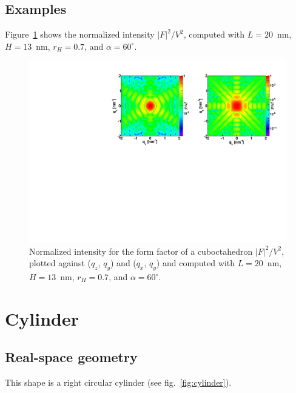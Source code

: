 \subsection{Examples}
Figure~\ref{fig:FFcuboctahEx} shows the normalized intensity $|F|^2/V^2$, computed with $L=20$~nm, $H=13$~nm, $r_H=0.7$, and $\alpha=60^{\circ}$.
\begin{figure}[h]
\begin{center}
\includegraphics[width=\textwidth]{Figures/figffcuboctah}
\end{center}
\caption{Normalized intensity for the form factor of a cuboctahedron $|F|^2/V^2$, plotted against ($q_z$, $q_y$) and  ($q_x$, $q_y$) and computed with $L=20$~nm, $H=13$~nm,
  $r_H=0.7$, and $\alpha=60^{\circ}$.}
\label{fig:FFcuboctahEx}
\end{figure}

\FloatBarrier


\newpage{\cleardoublepage}
\section{Cylinder} 
 
\subsection{Real-space geometry}
This shape is a right circular cylinder (see fig.~\ref{fig:cylinder}).

